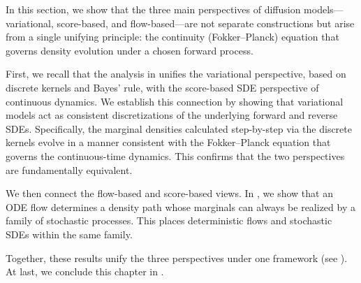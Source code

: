 In this section, we show that the three main perspectives of diffusion models—variational, score-based, and flow-based—are not separate constructions but arise from a single unifying principle: the continuity (Fokker–Planck) equation that governs density evolution under a chosen forward process.  


First, we recall that the analysis in  unifies the variational perspective, based on discrete kernels and Bayes' rule, with the score-based SDE perspective of continuous dynamics. We establish this connection by showing that variational models act as consistent discretizations of the underlying forward and reverse SDEs. Specifically, the marginal densities calculated step-by-step via the discrete kernels evolve in a manner consistent with the Fokker–Planck equation that governs the continuous-time dynamics. This confirms that the two perspectives are fundamentally equivalent.



 
 We then connect the flow-based and score-based views. In , we show that an ODE flow determines a density path whose marginals can always be realized by a family of stochastic processes. This places deterministic flows and stochastic SDEs within the same family.  

Together, these results unify the three perspectives under one framework (see ). At last, we conclude this chapter  in .








